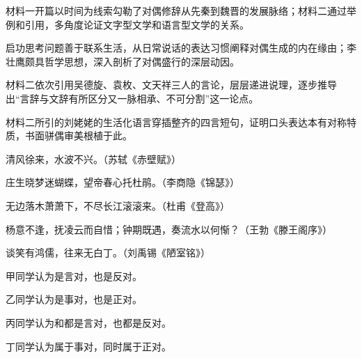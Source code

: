 \documentclass[11pt,a4paper]{ctexart}
\begin{document}
\begin{choices}
\item 材料一开篇以时间为线索勾勒了对偶修辞从先秦到魏晋的发展脉络；材料二通过举例和引用，多角度论证文字型文学和语言型文学的关系。
\item 启功思考问题善于联系生活，从日常说话的表达习惯阐释对偶生成的内在缘由；李壮鹰颇具哲学思想，深入剖析了对偶盛行的深层动因。
\item 材料二依次引用吴德旋、袁枚、文天祥三人的言论，层层递进说理，逐步推导出“言辞与文辞有所区分又一脉相承、不可分割”这一论点。
\item 材料二所引的刘姥姥的生活化语言穿插整齐的四言短句，证明口头表达本有对称特质，书面骈偶审美根植于此。
\end{choices}


\noindent{}清风徐来，水波不兴。（苏轼《赤壁赋》）\par
\noindent{}庄生晓梦迷蝴蝶，望帝春心托杜鹃。（李商隐《锦瑟》）\par
\noindent{}无边落木萧萧下，不尽长江滚滚来。（杜甫《登高》）\par
\noindent{}杨意不逢，抚凌云而自惜；钟期既遇，奏流水以何惭？（王勃《滕王阁序》）\par
\noindent{}谈笑有鸿儒，往来无白丁。（刘禹锡《陋室铭》）

\begin{choices}
\item 甲同学认为是言对，也是反对。
\item 乙同学认为是事对，也是正对。
\item 丙同学认为和都是言对，也都是反对。
\item 丁同学认为属于事对，同时属于正对。
\end{choices}


\par\vspace{2.2em}


\par\vspace{2.2em}\par\vspace{2.2em}
\end{document}
